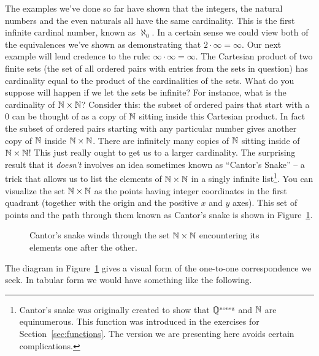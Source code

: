The examples we've done so far have shown that the integers, 
the natural numbers and the even naturals all have the same 
cardinality.  This is the first infinite cardinal number, known 
as $\aleph_0$.  In a certain sense we could view both
of the equivalences we've shown as demonstrating that 
$2 \cdot \infty = \infty$.  Our next example will lend 
credence to the rule: $\infty \cdot \infty = \infty$.  
The Cartesian product of two finite sets (the set of all 
ordered pairs with entries from the sets in question) has 
cardinality equal to the product of the cardinalities of 
the sets.   What do you suppose will happen if we let the sets
be infinite?   For instance, what is the cardinality of 
${\mathbb N} \times {\mathbb N}$?   Consider this:
the subset of ordered pairs that start with a 0 can be thought of as a copy
of ${\mathbb N}$ sitting inside this Cartesian product.  In fact 
the subset of ordered pairs
starting with any particular number gives another copy of ${\mathbb N}$ 
inside ${\mathbb N} \times {\mathbb N}$.  There
are infinitely many copies of ${\mathbb N}$  sitting inside of 
${\mathbb N} \times {\mathbb N}$!  This just really ought
to get us to a larger cardinality.   The surprising result that it 
\emph{doesn't} involves an idea sometimes known as 
  ``Cantor's Snake'' -- a trick that allows 
us to list the elements of ${\mathbb N} \times {\mathbb N}$ in a singly 
infinite list\footnote{Cantor's snake was originally created to show 
that ${\mathbb Q}^{\mbox{\tiny noneg}}$ and ${\mathbb N}$ are equinumerous.
This function was introduced in the exercises for 
Section~\ref{sec:functions}.   The version we are presenting
here avoids certain complications.}.
You can visualize the set ${\mathbb N} \times {\mathbb N}$ as the 
points having integer coordinates
in the first quadrant (together with the origin and the positive 
$x$ and $y$ axes).
This set of points and the path through them known as Cantor's snake is
shown in Figure~\ref{fig:cantors_snake_2}.


\begin{figure}[!btp]

\caption[Cantor's snake.]{Cantor's snake winds through the set %
${\mathbb N} \times {\mathbb N}$ encountering its
elements one after the other.}
\label{fig:cantors_snake_2} 
\end{figure}

The diagram in Figure~\ref{fig:cantors_snake_2} gives a visual form of the one-to-one correspondence
we seek.  In tabular form we would have something like the following.
\medskip

